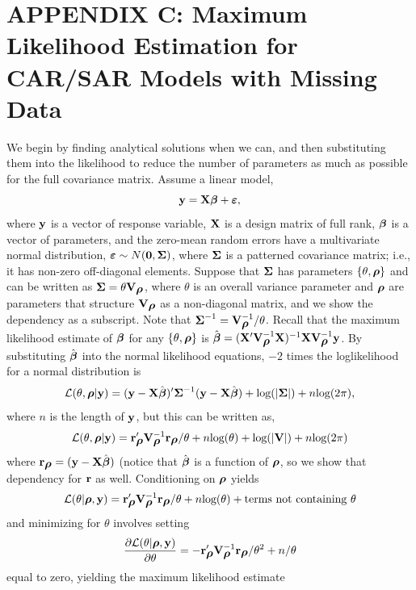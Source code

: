 \documentclass[11pt, titlepage]{article}\usepackage[]{graphicx}\usepackage[]{color}
\renewcommand{\theequation}{eqn \arabic{equation}}
\begin{document}
\clearpage
\setcounter{equation}{0}
\renewcommand{\theequation}{C.\arabic{equation}}
\setcounter{figure}{0}
\renewcommand{\thefigure}{C.\arabic{figure}}
\section{APPENDIX C: Maximum Likelihood Estimation for CAR/SAR Models with Missing Data}

We begin by finding analytical solutions when we can, and then substituting them into the likelihood to reduce the number of parameters as much as possible for the full covariance matrix.  Assume a linear model,
\[
  \mathbf{y} = \mathbf{X}\mbox{\boldmath $\beta$} + \mbox{\boldmath $\varepsilon$},
\]
where $\mathbf{y}$ is a vector of response variable, $\mathbf{X}$ is a design matrix of full rank, $\mbox{\boldmath $\beta$}$ is a vector of parameters, and the zero-mean random errors have a multivariate normal distribution, $\mbox{\boldmath $\varepsilon$} \sim N(\mathbf{0},\mbox{\boldmath $\Sigma$})$, where $\mbox{\boldmath $\Sigma$}$ is a patterned covariance matrix; i.e., it has non-zero off-diagonal elements.  Suppose that $\mbox{\boldmath $\Sigma$}$ has parameters $\{\theta,\mbox{\boldmath $\rho$}\}$ and can be written as $\mbox{\boldmath $\Sigma$} = \theta\mathbf{V}_{\mbox{\boldmath $\rho$}}$, where $\theta$ is an overall variance parameter and $\mbox{\boldmath $\rho$}$ are parameters that structure $\mathbf{V}_{\mbox{\boldmath $\rho$}}$ as a non-diagonal matrix, and we show the dependency as a subscript. Note that $\mbox{\boldmath $\Sigma$}^{-1} = \mathbf{V}^{-1}_{\mbox{\boldmath $\rho$}}/\theta$. Recall that the maximum likelihood estimate of $\mbox{\boldmath $\beta$}$ for any $\{\theta,\mbox{\boldmath $\rho$}\}$ is $\hat{\mbox{\boldmath $\beta$}} = (\mathbf{X}^{\prime}\mathbf{V}^{-1}_{\mbox{\boldmath $\rho$}}\mathbf{X})^{-1}\mathbf{X}\mathbf{V}^{-1}_{\mbox{\boldmath $\rho$}}\mathbf{y}$. By substituting $\hat{\mbox{\boldmath $\beta$}}$ into the normal likelihood equations, $-2$ times the loglikelihood for a normal distribution is
\[
  \mathcal{L}(\theta,\mbox{\boldmath $\rho$}|\mathbf{y}) = (\mathbf{y} - \mathbf{X}\hat{\mbox{\boldmath $\beta$}})^{\prime}\mbox{\boldmath $\Sigma$}^{-1}(\mathbf{y} - \mathbf{X}\hat{\mbox{\boldmath $\beta$}}) + \textrm{log}(|\mbox{\boldmath $\Sigma$}|) + n\textrm{log}(2\pi),
\]
where $n$ is the length of $\mathbf{y}$, but this can be written as,
\begin{equation}\label{eq:MVNloglike}
\mathcal{L}(\theta,\mbox{\boldmath $\rho$}|\mathbf{y}) = \mathbf{r}_{\mbox{\boldmath $\rho$}}^{\prime}\mathbf{V}^{-1}_{\mbox{\boldmath $\rho$}}\mathbf{r}_{\mbox{\boldmath $\rho$}}/\theta + n\textrm{log}(\theta) + \textrm{log}(|\mathbf{V}|) + n\textrm{log}(2\pi)
\end{equation}
where $\mathbf{r}_{\mbox{\boldmath $\rho$}} = (\mathbf{y} - \mathbf{X}\hat{\mbox{\boldmath $\beta$}})$ (notice that $\hat{\mbox{\boldmath $\beta$}}$ is a function of $\mbox{\boldmath $\rho$}$, so we show that dependency for $\mathbf{r}$ as well.  Conditioning on $\mbox{\boldmath $\rho$}$ yields 
\[
\mathcal{L}(\theta|\mbox{\boldmath $\rho$},\mathbf{y}) = \mathbf{r}_{\mbox{\boldmath $\rho$}}^{\prime}\mathbf{V}^{-1}_{\mbox{\boldmath $\rho$}}\mathbf{r}_{\mbox{\boldmath $\rho$}}/\theta + n\textrm{log}(\theta)+ \textrm{terms not containing } \theta
\]
and minimizing for $\theta$ involves setting
\[
\frac{\partial \mathcal{L}(\theta|\mbox{\boldmath $\rho$},\mathbf{y})}{\partial \theta} = -\mathbf{r}^{\prime}_{\mbox{\boldmath $\rho$}}\mathbf{V}^{-1}_{\mbox{\boldmath $\rho$}}\mathbf{r}_{\mbox{\boldmath $\rho$}}/\theta^2 + n/\theta
\]
equal to zero, yielding the maximum likelihood estimate
\end{document}
